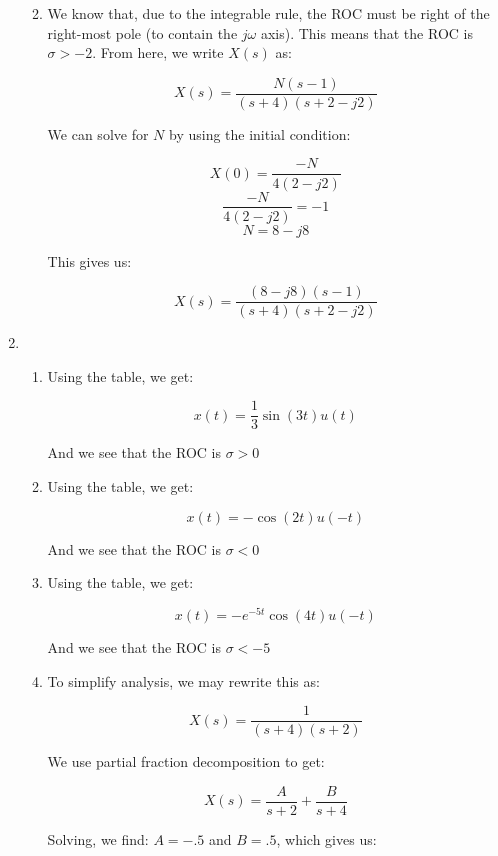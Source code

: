 \begin{enumerate}
\begin{enumerate}
\begin{itemize}
        \end{itemize}

      \item 

        We know that, due to the integrable rule, the ROC must be right of the right-most pole (to contain the $j\omega$ axis). This means that the ROC is $\sigma>-2$. From here, we write $X(s)$ as:

        $$X(s)=\frac{N(s-1)}{(s+4)(s+2-j2)}$$

        We can solve for $N$ by using the initial condition:

        $$X(0)=\frac{-N}{4(2-j2)}$$
        $$\frac{-N}{4(2-j2)}=-1$$
        $$N=8-j8$$

        This gives us:

        $$\boxed{X(s)=\frac{(8-j8)(s-1)}{(s+4)(s+2-j2)}}$$

    \end{enumerate}

  \item

    \begin{enumerate}

      \item Using the table, we get:

        $$\boxed{x(t)=\frac{1}{3}\sin(3t)u(t)}$$

        And we see that the ROC is $\boxed{\sigma>0}$

      \item Using the table, we get:

        $$\boxed{x(t)=-\cos(2t)u(-t)}$$

        And we see that the ROC is $\boxed{\sigma<0}$

      \item Using the table, we get:

        $$\boxed{x(t)=-e^{-5t}\cos(4t)u(-t)}$$

        And we see that the ROC is $\boxed{\sigma<-5}$

      \item To simplify analysis, we may rewrite this as:

        $$X(s)=\frac{1}{(s+4)(s+2)}$$

        We use partial fraction decomposition to get:

        $$X(s)=\frac{A}{s+2}+\frac{B}{s+4}$$

        Solving, we find: $A=-.5$ and $B=.5$, which gives us:


\end{enumerate}
\end{enumerate}
